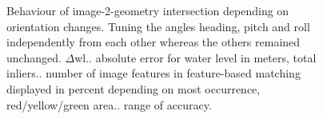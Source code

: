 \documentclass[review]{elsarticle}
\begin{document}
\begin{figure}[htbp!]
\begin{center}
	 	\begin{minipage}{\columnwidth}
	 		\centering
	 	\end{minipage}
	 	\begin{minipage}{\columnwidth}
	 		\centering
	 	\end{minipage}
		\begin{minipage}{\columnwidth} 
	 		\centering
	 	\end{minipage}
	
	\caption{Behaviour of image-2-geometry intersection depending on orientation changes. Tuning the angles heading, pitch and roll independently from each other whereas the others remained unchanged. ${\Delta}$wl.. absolute error for water level in meters, total inliers.. number of image features in feature-based matching displayed in percent depending on most occurrence, red/yellow/green area.. range of accuracy.}
	\label{fig:sensor_sensi}
\end{center}
\end{figure}
\end{document}
